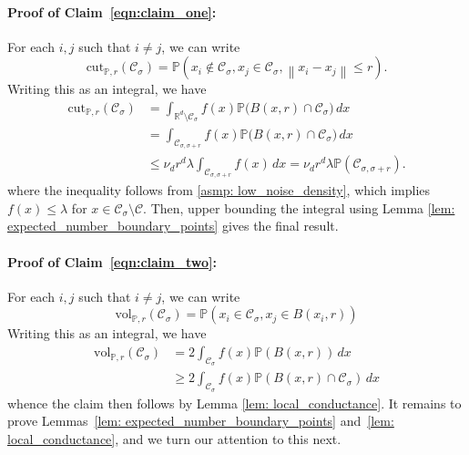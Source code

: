 \documentclass[11pt,twoside]{article}
\theoremstyle{definition}
\newcommand{\vol}{\mathrm{vol}}
\newcommand{\cut}{\mathrm{cut}}
\newcommand{\Reals}{\mathbb{R}}
\newcommand{\Rd}{\Reals^d}
\newcommand{\norm}[1]{\left\lVert#1\right\rVert}
\newcommand{\1}{\mathbbm{1}}
\newcommand{\Pbb}{\mathbb{P}}
\newcommand{\Cset}{\mathcal{C}}
\newcommand{\Csig}{\Cset_{\sigma}}
\newcommand{\Csigr}{\Cset_{\sigma,\sigma + r}}
\newcommand{\dx}{\,dx}
\begin{document}
\paragraph{Proof of Claim~\eqref{eqn:claim_one}: } For each $i,j$ such that $i \neq j$, we can write 
\begin{equation*}
\cut_{\Pbb,r}(\Csig) =  \Pbb(x_i \not\in \Csig, x_j \in \Csig, \norm{x_i - x_j} \leq r).
\end{equation*}
Writing this as an integral, we have
\begin{align*}
\cut_{\Pbb,r}(\Csig) & = \int_{\Rd \setminus \Csig} f(x) \Pbb\bigl(B(x,r) \cap \Csig\bigr) \dx \\
& = \int_{\Csigr} f(x) \Pbb\bigl(B(x,r) \cap \Csig\bigr) \dx \\
& \leq \nu_d r^d \lambda  \int_{\Csigr} f(x) \dx = \nu_d r^d \lambda \Pbb(\Csigr).
\end{align*}
where the inequality follows from \ref{asmp: low_noise_density}, which implies $f(x) \leq \lambda$ for $x \in \Csig \setminus \Cset$. Then, upper bounding the integral using Lemma \ref{lem: expected_number_boundary_points} gives the final result.


\paragraph{Proof of Claim~\eqref{eqn:claim_two}: }  For each $i,j$ such that $i \neq j$, we can write 
\begin{equation*}
\vol_{\Pbb,r}(\Csig) = \Pbb(x_i \in \Csig, x_j \in B(x_i,r))
\end{equation*}
Writing this as an integral, we have
\begin{align*}
\vol_{\Pbb,r}(\Csig) & = 2 \int_{\Csig} f(x) \Pbb(B(x,r)) \dx \\
& \geq 2 \int_{\Csig} f(x) \Pbb(B(x,r) \cap \Csig) \dx
\end{align*}
whence the claim then follows by Lemma \ref{lem: local_conductance}.
It remains to prove Lemmas~\ref{lem: expected_number_boundary_points} and~\ref{lem: local_conductance}, and we turn our attention to this next.
\end{document}
